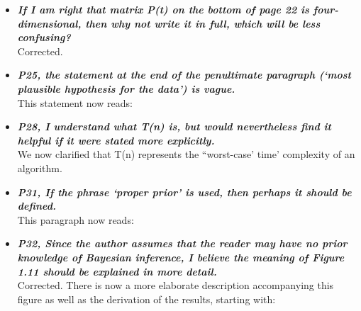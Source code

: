 \documentclass[english]{article}
\begin{document}
\begin{itemize}
\begin{quote}
\myeditsvsixtwo
\end{quote}



\item {
{\it
\textbf{
If I am right that matrix P(t) on the bottom of page 22 is four-dimensional, then why not write it in full, which will be less confusing?
}%
}%
}%
\\
Corrected.




\item {
{\it
\textbf{
P25, the statement at the end of the penultimate paragraph (`most plausible hypothesis for the data') is vague.
}%
}%
}%
\\
This statement now reads:

\begin{quote}
\myeditsveight
\end{quote}



\item {
{\it
\textbf{
P28, I understand what T(n) is, but would nevertheless find it helpful if it were stated more explicitly.
}%
}%
}%
\\
We now clarified that T(n) represents the ``worst-case' time' complexity of an algorithm.


\item {
{\it
\textbf{
P31, If the phrase `proper prior' is used, then perhaps it should be defined.
}%
}%
}%
\\
This paragraph now reads:

\begin{quote}
\myeditsvnine
\end{quote}


\item {
{\it
\textbf{
P32, Since the author assumes that the reader may have no prior knowledge of Bayesian inference, I believe the meaning of Figure 1.11 should be explained in more detail.
}%
}%
}%
\\
Corrected. There is now a more elaborate description accompanying this figure as well as the derivation of the results, starting with:


\end{itemize}
\end{document}
